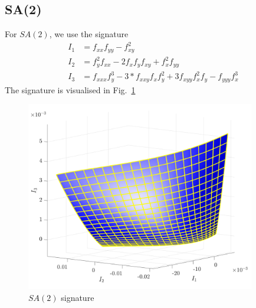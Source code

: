 \documentclass[11pt]{article}
\begin{document}
\subsection{SA(2)}
For $SA(2)$, we use the signature
\begin{equation}\label{eq:sa2sig}
  \begin{split}
    I_1 &= f_{xx}f_{yy} - f_{xy}^2  \\
    I_2 &= f_y^2f_{xx} - 2f_x f_y f_{xy} + f_x^2f_{yy} \\
    I_3 &= f_{xxx}f_y^3 - 3*f_{xxy}f_x f_y^2 + 3f_{xyy}f_x^2f_y - f_{yyy}f_x^3
  \end{split}
\end{equation}
The signature is visualised in Fig.~\ref{fig:sa2signature}
\begin{figure}
  \centering
    \includegraphics[width=10cm]{figures/SA2_signature}
  \caption{$SA(2)$ signature}
  \label{fig:sa2signature}
\end{figure}
\end{document}

